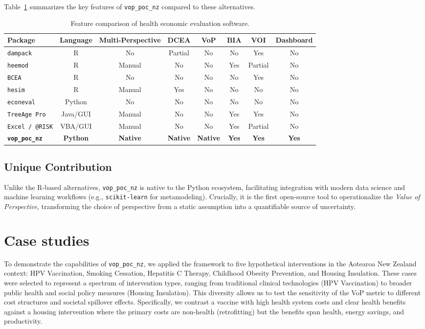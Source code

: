 \documentclass{article}
\newcommand{\pkg}[1]{\texttt{#1}}
\begin{document}
Table~\ref{tab:software_comparison} summarizes the key features of \pkg{vop\_poc\_nz} compared to these alternatives.

\begin{table}[ht]
\centering
\begin{tabular}{lccccccc}
\hline
Package & Language & Multi-Perspective & DCEA & VoP & BIA & VOI & Dashboard \\
\hline
\pkg{dampack} & R & No & Partial & No & No & Yes & No \\
\pkg{heemod} & R & Manual & No & No & Yes & Partial & No \\
\pkg{BCEA} & R & No & No & No & No & Yes & No \\
\pkg{hesim} & R & Manual & Yes & No & No & No & No \\
\pkg{econeval} & Python & No & No & No & No & No & No \\
\pkg{TreeAge Pro} & Java/GUI & Manual & No & No & Yes & Yes & No \\
\pkg{Excel / @RISK} & VBA/GUI & Manual & No & No & Yes & Partial & No \\
\textbf{\pkg{vop\_poc\_nz}} & \textbf{Python} & \textbf{Native} & \textbf{Native} & \textbf{Native} & \textbf{Yes} & \textbf{Yes} & \textbf{Yes} \\
\hline
\end{tabular}
\caption{Feature comparison of health economic evaluation software.}
\label{tab:software_comparison}
\end{table}

\subsection{Unique Contribution}
Unlike the R-based alternatives, \pkg{vop\_poc\_nz} is native to the Python ecosystem, facilitating integration with modern data science and machine learning workflows (e.g., \pkg{scikit-learn} for metamodeling).
Crucially, it is the first open-source tool to operationalize the \emph{Value of Perspective}, transforming the choice of perspective from a static assumption into a quantifiable source of uncertainty.

\section{Case studies} \label{sec:cases}

To demonstrate the capabilities of \pkg{vop\_poc\_nz}, we applied the framework to five hypothetical interventions in the Aotearoa New Zealand context: HPV Vaccination, Smoking Cessation, Hepatitis C Therapy, Childhood Obesity Prevention, and Housing Insulation.
These cases were selected to represent a spectrum of intervention types, ranging from traditional clinical technologies (HPV Vaccination) to broader public health and social policy measures (Housing Insulation).
This diversity allows us to test the sensitivity of the VoP metric to different cost structures and societal spillover effects.
Specifically, we contrast a vaccine with high health system costs and clear health benefits against a housing intervention where the primary costs are non-health (retrofitting) but the benefits span health, energy savings, and productivity.
\end{document}
